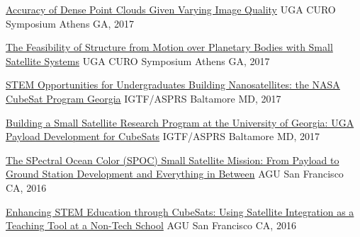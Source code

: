 \documentclass[10pt,a4paper]{article}
\begin{document}
\headedsection
  {{\color{bluegreen} \faMapO} \href{http://smallsat.uga.edu/images/documents/posters/nirav_curo_poster.pdf}{Accuracy of Dense Point Clouds Given Varying Image Quality}}{%
  \headedsubsection
    {UGA CURO Symposium}
    {Athens GA, 2017}
    {}
}

\headedsection
  {{\color{bluegreen} \faTelevision} \href{http://smallsat.uga.edu/images/documents/presentations/Space_SFM-2017_CURO_Syposium.pdf}{The Feasibility of Structure from Motion over Planetary Bodies with Small Satellite Systems}}{%
  \headedsubsection
    {UGA CURO Symposium}
    {Athens GA, 2017}
    {}
}

\headedsection
  {{\color{bluegreen} \faTelevision} \href{http://smallsat.uga.edu/images/documents/posters/2017-ASPRS-IGTF-1-STEMopprotunities.pdf}{STEM Opportunities for Undergraduates Building Nanosatellites: the NASA CubeSat Program Georgia}}{%
  \headedsubsection
    {IGTF/ASPRS}
    {Baltamore MD, 2017}
    {}
}

\headedsection
  {{\color{bluegreen} \faTelevision} \href{http://smallsat.uga.edu/images/documents/posters/2017-ASPRS-IGTF-2-PayloadDevelopment.pdf}{Building a Small Satellite Research Program at the University of Georgia: UGA Payload Development for CubeSats}}{%
  \headedsubsection
    {IGTF/ASPRS}
    {Baltamore MD, 2017}
    {}
}

\headedsection
  {{\color{bluegreen} \faMapO} \href{http://smallsat.uga.edu/images/documents/posters/AGU2016-SPOC-final2.pdf}{The SPectral Ocean Color (SPOC) Small Satellite Mission: From Payload to Ground Station Development and Everything in Between}}{%
  \headedsubsection
    {AGU}
    {San Francisco CA, 2016}
    {}
}

\headedsection
  {{\color{bluegreen} \faMapO} \href{http://smallsat.uga.edu/images/documents/posters/AGU2016-SSRL-final3.pdf}{Enhancing STEM Education through CubeSats: Using Satellite Integration as a Teaching Tool at a Non-Tech School}}{%
  \headedsubsection
    {AGU}
    {San Francisco CA, 2016}
    {}
}
\end{document}
